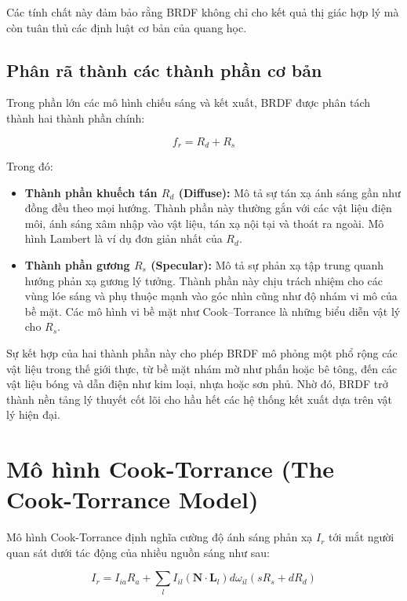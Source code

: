 Các tính chất này đảm bảo rằng BRDF không chỉ cho kết quả thị giác hợp lý mà còn tuân thủ các định luật cơ bản của quang học.

\subsection{Phân rã thành các thành phần cơ bản}

Trong phần lớn các mô hình chiếu sáng và kết xuất, BRDF được phân tách thành hai thành phần chính:

\begin{equation}
	f_r = R_d + R_s
\end{equation}

Trong đó:
\begin{itemize}
	\item \textbf{Thành phần khuếch tán $R_d$ (Diffuse):} Mô tả sự tán xạ ánh sáng gần như đồng đều theo mọi hướng. Thành phần này thường gắn với các vật liệu điện môi, ánh sáng xâm nhập vào vật liệu, tán xạ nội tại và thoát ra ngoài. Mô hình Lambert là ví dụ đơn giản nhất của $R_d$.
	
	\item \textbf{Thành phần gương $R_s$ (Specular):} Mô tả sự phản xạ tập trung quanh hướng phản xạ gương lý tưởng. Thành phần này chịu trách nhiệm cho các vùng lóe sáng và phụ thuộc mạnh vào góc nhìn cũng như độ nhám vi mô của bề mặt. Các mô hình vi bề mặt như Cook–Torrance là những biểu diễn vật lý cho $R_s$.
\end{itemize}

Sự kết hợp của hai thành phần này cho phép BRDF mô phỏng một phổ rộng các vật liệu trong thế giới thực, từ bề mặt nhám mờ như phấn hoặc bê tông, đến các vật liệu bóng và dẫn điện như kim loại, nhựa hoặc sơn phủ. Nhờ đó, BRDF trở thành nền tảng lý thuyết cốt lõi cho hầu hết các hệ thống kết xuất dựa trên vật lý hiện đại.

\section{Mô hình Cook-Torrance (The Cook-Torrance Model)}

Mô hình Cook-Torrance định nghĩa cường độ ánh sáng phản xạ $I_r$ tới mắt người quan sát dưới tác động của nhiều nguồn sáng như sau:

\begin{equation}
I_r = I_{ia}R_a + \sum_{l} I_{il} (\mathbf{N} \cdot \mathbf{L}_l) d\omega_{il} (sR_s + dR_d)
\end{equation}

